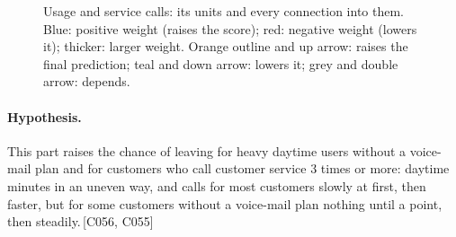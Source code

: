\documentclass[a4paper,10pt]{article}
\newif\ifreviewmarks
\newcommand{\reviewrule}{\noindent{\color{BrickRed}\rule{\linewidth}{0.8pt}}}
\newenvironment{drafted}[1][]{%
  \ifreviewmarks\par\addvspace{\medskipamount}\reviewrule\par\nopagebreak
  \noindent{\color{BrickRed}\sffamily\footnotesize\textbf{Thesis Draft}\quad #1\hfill review}\par\nopagebreak\smallskip\fi}{%
  \ifreviewmarks\par\smallskip\noindent{\color{BrickRed}\sffamily\footnotesize end of thesis draft}\par\nopagebreak\reviewrule\par\medskip\fi}
\begin{document}
\begin{drafted}[plain-language layer: churn100-s7-c1]
\begin{figure}[H]
{}%
\caption{Usage and service calls: its units and every connection into them. Blue: positive weight (raises the score); red: negative weight (lowers it); thicker: larger weight. Orange outline and up arrow: raises the final prediction; teal and down arrow: lowers it; grey and double arrow: depends.}
\label{fig:churn100s7c1:units-ann83}
\end{figure}
\paragraph{Hypothesis.} This part raises the chance of leaving for heavy daytime users without a voice-mail plan and for customers who call customer service 3 times or more: daytime minutes in an uneven way, and calls for most customers slowly at first, then faster, but for some customers without a voice-mail plan nothing until a point, then steadily.\,{\scriptsize\textcolor{NavyBlue}{[C056, C055]}}

\end{drafted}
\end{document}
